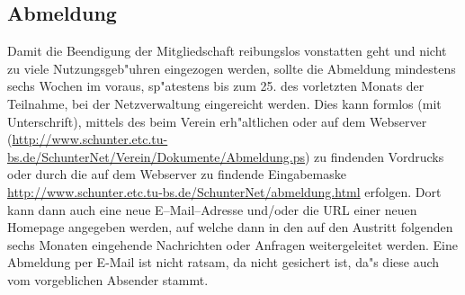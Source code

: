 
\subsection{Abmeldung}

Damit die Beendigung der Mitgliedschaft reibungslos vonstatten geht und nicht
zu viele Nutzungsgeb"uhren eingezogen werden, sollte die Abmeldung mindestens
sechs Wochen im voraus, sp"atestens bis zum 25. des vorletzten Monats der
Teilnahme, bei der Netzverwaltung eingereicht werden. Dies kann
formlos (mit Unterschrift), mittels des beim Verein erh"altlichen oder auf dem
Webserver
(\url{http://www.schunter.etc.tu-bs.de/SchunterNet/Verein/Dokumente/Abmeldung.ps})
zu findenden Vordrucks oder durch die auf dem Webserver zu findende
Eingabemaske \url{http://www.schunter.etc.tu-bs.de/SchunterNet/abmeldung.html}
erfolgen. Dort kann dann auch eine neue \glossar E--Mail--Adresse und/oder die
URL einer neuen \glossar Homepage angegeben werden, auf welche dann in den auf
den Austritt folgenden sechs Monaten eingehende Nachrichten oder Anfragen
weitergeleitet werden. Eine Abmeldung per \glossar E-Mail ist nicht ratsam, da
nicht gesichert ist, da"s diese auch vom vorgeblichen Absender stammt.
